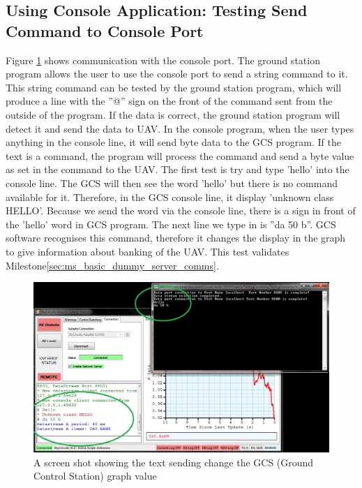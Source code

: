 \subsection{Using Console Application: Testing Send Command to Console Port}
\label{sec:send_console}
Figure \ref{test text} shows communication with the console port.
The ground station program allows the user to use the console port to send a string command to it. 
This string command can be tested by the ground station program, which will produce a line with the ''@'' sign on the front of the command sent from the outside of the program.
If the data is correct, the ground station program will detect it and send the data to UAV. 
In the console program, when the user types anything in the console line, it will send byte data to the GCS program.
If the text is a command, the program will process the command and send a byte value as set in the command to the UAV.
The first test is try and type 'hello' into the console line.
The GCS will then see the word 'hello' but there is no command available for it.
Therefore, in the GCS console line, it display 'unknown class HELLO'.
Because we send the word via the console line, there is a \@ sign in front of the 'hello' word in GCS program.
The next line we type in is ''da 50 b''.
GCS software recognises this command, therefore it changes the display in the graph to give information about banking of the UAV.
This test validates Milestone\ref{sec:ms_basic_dummy_server_comms}.
\begin{figure}[H]
\begin{center}
\includegraphics[width=1.00\textwidth]{testing_screenshots/test_sending_test_text_useful.png} 
\end{center}
\caption{A screen shot showing the text sending change the GCS (Ground Control Station) graph value\label{test text}}
\end{figure}

